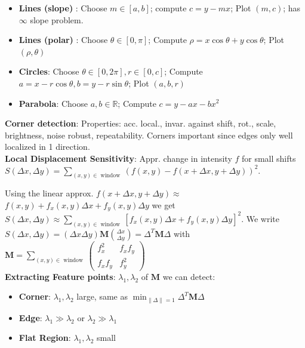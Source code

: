 
\begin{itemize}[leftmargin=*]
\item \textbf{Lines (slope)} : Choose $m\in [a,b]$; compute $c=y-mx$; Plot $(m,c)$; has $\infty$ slope problem.
\item \textbf{Lines (polar)} : Choose $\theta \in [0,\pi]$; Compute $ \rho = x \cos \theta + y \cos \theta$; Plot $(\rho,\theta)$
\item \textbf{Circles}: Choose $\theta \in [0,2\pi],r\in[0,c] $; Compute $a=x-r\cos \theta, b = y-r\sin \theta$; Plot $(a,b,r)$
\item \textbf{Parabola}: Choose $a,b \in \mathbb{R}$; Compute $c=y-ax-bx^2$
\end{itemize}
\textbf{Corner detection}: Properties: acc. local., invar. against shift, rot., scale, brightness, noise robust, repeatability. Corners important since edges only well localized in 1 direction.\\
\textbf{Local Displacement Sensitivity}: Appr. change in intensity $f$ for small shifts $S(\Delta x, \Delta y)=\sum_{(x, y) \in \text { window }}(f(x, y)-f(x+\Delta x, y+\Delta y))^2$. 


Using the linear approx. $f(x+\Delta x, y+\Delta y) \approx$  $f(x, y)+f_x(x, y) \Delta x+f_y(x, y) \Delta y$ we get $S(\Delta x, \Delta y) \approx \sum_{(x, y) \in \text { window }}\left[f_x(x, y) \Delta x+f_y(x, y) \Delta y\right]^2$. We write $S(\Delta x, \Delta y)=(\Delta x \Delta y) \mathbf{M}\binom{\Delta x}{\Delta y} = \Delta^T \mathbf{M} \Delta$ with 
$\mathbf{M}=\sum_{(x, y) \in \text { window }}\left(\begin{array}{cc}f_x^2 & f_x f_y \\ f_x f_y & f_y^2\end{array}\right)$\\

\textbf{Extracting Feature points}: $\lambda_1, \lambda_2$ of $ \mathbf{M}$ we can detect:
\begin{itemize}[leftmargin =*]
\item \textbf{Corner}: $\lambda_1,\lambda_2$ large, same as $\min _{\|\Delta\|=1} \Delta^T \mathbf{M} \Delta$
\item \textbf{Edge}: $\lambda_1 \gg \lambda_2$ or $\lambda_2 \gg \lambda_1$
\item \textbf{Flat Region}: $\lambda_1,\lambda_2$ small
\end{itemize}




